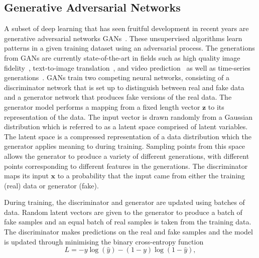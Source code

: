 \documentclass[12pt]{iopart}
\begin{document}
\subsection{Generative Adversarial Networks}
%
%
A subset of deep learning that has seen fruitful development in recent years
are generative adversarial networks \acp{GAN}~\cite{Goodfellow2014}. These unsupervised algorithms learn patterns in a
given training dataset using an adversarial process. The generations from
\acp{GAN} are currently state-of-the-art in fields such as high quality image
fidelity~\cite{brock2018large,karras2019analyzing}, text-to-image
translation~\cite{reed2016generative}, and video
prediction~\cite{liang2017dual} as well as time-series
generations~\cite{esteban2017realvalued}.
%
%
\acp{GAN} train two competing neural networks, consisting of a discriminator
network that is set up to distinguish between real and fake data and a
generator network that produces fake versions of the real data. The generator model performs a mapping from a fixed length vector $\mathbf{z}$ to its
representation of the data. The input vector is drawn randomly from a Gaussian distribution which is referred to as a latent space comprised of latent variables. The latent space is a compressed representation of a data distribution which the generator applies meaning to during training. Sampling points from this space allows the generator to produce a variety of different generations, with different points corresponding to different features in the generations. The discriminator maps its input $\mathbf{x}$ to a probability that the input came from either the training (real) data or
generator (fake).

%
%
During training, the discriminator and generator are updated using batches of data. Random latent vectors are given to the generator to produce a batch of fake samples and an equal batch of real samples is taken from the training data. The discriminator makes predictions on the real and fake samples and the model is updated through minimising the binary cross-entropy function \cite{Goodfellow-et-al-2016}
%
\begin{equation}
    L = -y \log(\hat{y}) - (1 - y) \log(1-\hat{y}),
    \label{eqn:crossentropy}
\end{equation}
\end{document}
